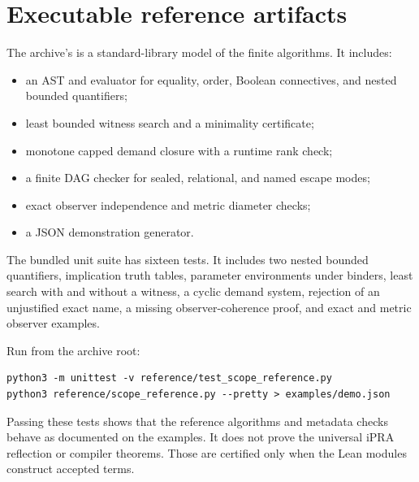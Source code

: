 \section{Executable reference artifacts}
\label{app:reference}

The archive's  is a standard-library model
of the finite algorithms.  It includes:

\begin{itemize}
\item an AST and evaluator for equality, order, Boolean connectives, and nested
  bounded quantifiers;
\item least bounded witness search and a minimality certificate;
\item monotone capped demand closure with a runtime rank check;
\item a finite DAG checker for sealed, relational, and named escape modes;
\item exact observer independence and metric diameter checks;
\item a JSON demonstration generator.
\end{itemize}

The bundled unit suite has sixteen tests.  It includes two nested bounded
quantifiers, implication truth tables, parameter environments under binders,
least search with and without a witness, a cyclic demand system, rejection of
an unjustified exact name, a missing observer-coherence proof, and exact and
metric observer examples.

Run from the archive root:

\begin{verbatim}
python3 -m unittest -v reference/test_scope_reference.py
python3 reference/scope_reference.py --pretty > examples/demo.json
\end{verbatim}

Passing these tests shows that the reference algorithms and metadata checks
behave as documented on the examples.  It does not prove the universal iPRA
reflection or compiler theorems.  Those are certified only when the Lean
modules construct accepted  terms.
